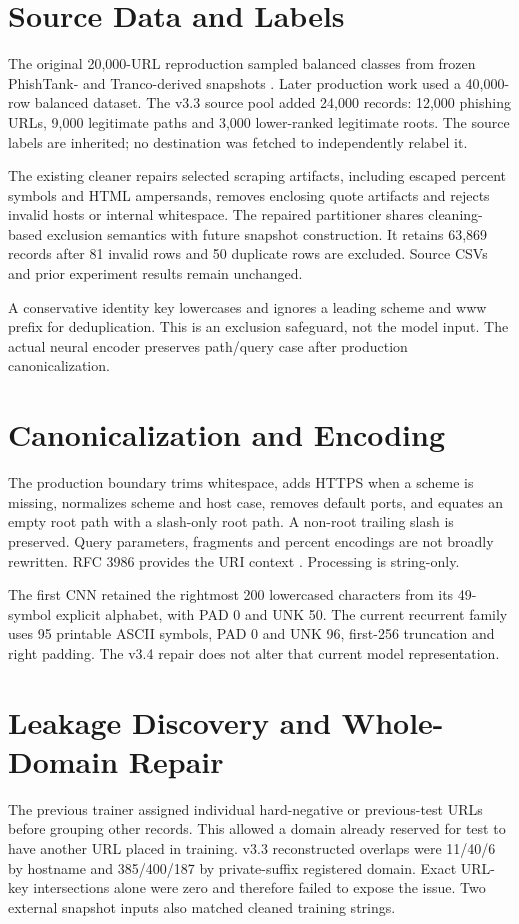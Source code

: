 \section{Source Data and Labels}
The original 20,000-URL reproduction sampled balanced classes from frozen PhishTank- and Tranco-derived snapshots \cite{phishtank,lepochat2019tranco}. Later production work used a 40,000-row balanced dataset. The v3.3 source pool added 24,000 records: 12,000 phishing URLs, 9,000 legitimate paths and 3,000 lower-ranked legitimate roots. The source labels are inherited; no destination was fetched to independently relabel it.

The existing cleaner repairs selected scraping artifacts, including escaped percent symbols and HTML ampersands, removes enclosing quote artifacts and rejects invalid hosts or internal whitespace. The repaired partitioner shares cleaning-based exclusion semantics with future snapshot construction. It retains 63,869 records after 81 invalid rows and 50 duplicate rows are excluded. Source CSVs and prior experiment results remain unchanged.

A conservative identity key lowercases and ignores a leading scheme and www prefix for deduplication. This is an exclusion safeguard, not the model input. The actual neural encoder preserves path/query case after production canonicalization.

\section{Canonicalization and Encoding}
The production boundary trims whitespace, adds HTTPS when a scheme is missing, normalizes scheme and host case, removes default ports, and equates an empty root path with a slash-only root path. A non-root trailing slash is preserved. Query parameters, fragments and percent encodings are not broadly rewritten. RFC 3986 provides the URI context \cite{rfc3986}. Processing is string-only.

The first CNN retained the rightmost 200 lowercased characters from its 49-symbol explicit alphabet, with PAD 0 and UNK 50. The current recurrent family uses 95 printable ASCII symbols, PAD 0 and UNK 96, first-256 truncation and right padding. The v3.4 repair does not alter that current model representation.

\section{Leakage Discovery and Whole-Domain Repair}
The previous trainer assigned individual hard-negative or previous-test URLs before grouping other records. This allowed a domain already reserved for test to have another URL placed in training. v3.3 reconstructed overlaps were 11/40/6 by hostname and 385/400/187 by private-suffix registered domain. Exact URL-key intersections alone were zero and therefore failed to expose the issue. Two external snapshot inputs also matched cleaned training strings.


